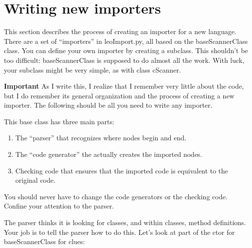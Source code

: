 \documentclass[a4paper,10pt,english]{sphinxmanual}
\begin{document}
\section{Writing new importers}
\label{customizing:writing-new-importers}
This section describes the process of creating an importer for a new language.
There are a set of ``importers'' in leoImport.py, all based on the
baseScannerClass class. You can define your own importer by creating a subclass.
This shouldn't be too difficult: baseScannerClass is supposed to do almost all
the work. With luck, your subclass might be very simple, as with class cScanner.

\textbf{Important} As I write this, I realize that I remember very little about the
code, but I do remember its general organization and the process of creating a
new importer. The following should be all you need to write any importer.

This base class has three main parts:
\begin{enumerate}
\item {} 
The ``parser'' that recognizes where nodes begin and end.

\item {} 
The ``code generator'' the actually creates the imported nodes.

\item {} 
Checking code that ensures that the imported code is equivalent
to the original code.

\end{enumerate}

You should never have to change the code generators or the checking code.
Confine your attention to the parser.

The parser thinks it is looking for classes, and within classes,
method definitions.  Your job is to tell the parser how to do this.
Let's look at part of the ctor for baseScannerClass for clues:
\end{document}
